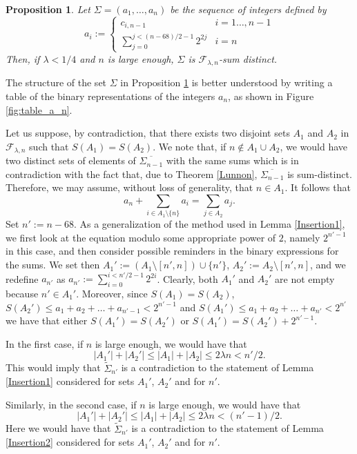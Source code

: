 \documentclass[a4paper]{amsart}
\theoremstyle{plain}
\newtheorem{Proposition}[Definition]{Proposition}
\begin{document}
\begin{Proposition}\label{Direct1}
Let $\Sigma=(a_1,\dots,a_n)$ be the sequence of integers defined by
$$a_i:=\begin{cases}
c_{i,n-1} & i=1\ldots, n-1\\
\sum_{j=0}^{j<(n-68)/2-1} 2^{2j} & i=n
\end{cases}$$
Then, if $\lambda<1/4$ and $n$ is large enough, $\Sigma$ is $\mathcal{F}_{\lambda,n}$-sum distinct.
\end{Proposition}

The structure of the set $\Sigma$ in Proposition \ref{Direct1} is better understood by writing a table of the binary representations of the integers $a_n$, as shown in Figure \ref{fig:table_a_n}.

\proof
Let us suppose, by contradiction, that there exists two disjoint sets $A_1$ and $A_2$ in $\mathcal{F}_{\lambda,n}$ such that $S(A_1)=S(A_2)$.
We note that, if $n\not \in A_1\cup A_2$, we would have two distinct sets of elements of $\overline{\Sigma_{n-1}}$ with the same sums which is in contradiction with the fact that, due to Theorem \ref{Lunnon}, $\overline{\Sigma_{n-1}}$ is sum-distinct.
Therefore, we may assume, without loss of generality, that $n\in A_1$. 
It follows that
$$a_n+\sum_{i\in A_1\setminus \{n\}} a_i=\sum_{j\in A_2}a_j.$$
Set $n':=n-68$.  As a generalization of the method used in Lemma \ref{Insertion1}, we first look at the equation modulo some appropriate power of $2$, namely $2^{n'-1}$ in this case, and then consider possible reminders in the binary expressions for the sums. We set then $A_1':= (A_1\setminus [n',n]) \cup \{n'\}$, $A_2':=A_2\setminus [n',n]$,  and we redefine $a_{n'}$ as $a_{n'}:=\sum_{i=0}^{i<n'/2-1} 2^{2i}$.  Clearly,  both $A_1'$ and $A_2'$ are not empty because $n'\in A_1'$.  Moreover,  since $S(A_1)=S(A_2)$,  $S(A_2') \leq a_1 + a_2 + \ldots + a_{n'-1} < 2^{n'-1}$ and $S(A_1') \leq a_1 + a_2 + \ldots + a_{n'} < 2^{n'}$  we have that either $S(A_1')=S(A_2')$ or $S(A_1')=S(A_2')+2^{n'-1}$. 

In the first case, if $n$ is large enough, we would have that
$$|A_1'|+|A_2'|\leq |A_1| + |A_2| \leq  2\lambda n<n'/2.$$
This would imply that $\widetilde{\Sigma}_{n'}$ is a contradiction to the statement of Lemma \ref{Insertion1} considered for sets $A_1'$, $A_2'$ and for $n'$.

Similarly, in the second case, if $n$ is large enough, we would have that
$$|A_1'|+|A_2'| \leq |A_1| + |A_2| \leq 2\lambda n<(n'-1)/2.$$
Here we would have that $\widetilde{\Sigma}_{n'}$ is a contradiction to the statement of Lemma \ref{Insertion2} considered for sets $A_1'$, $A_2'$ and for $n'$.
\end{document}
